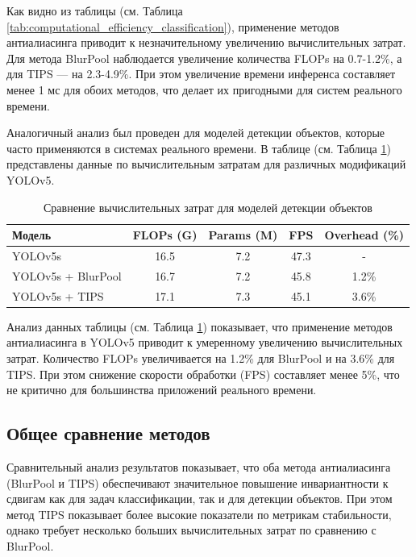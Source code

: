 Как видно из таблицы (см. Таблица \ref{tab:computational_efficiency_classification}), применение методов антиалиасинга приводит к незначительному увеличению вычислительных затрат. Для метода BlurPool наблюдается увеличение количества FLOPs на 0.7-1.2\%, а для TIPS — на 2.3-4.9\%. При этом увеличение времени инференса составляет менее 1 мс для обоих методов, что делает их пригодными для систем реального времени.

Аналогичный анализ был проведен для моделей детекции объектов, которые часто применяются в системах реального времени. В таблице (см. Таблица \ref{tab:computational_efficiency_detection}) представлены данные по вычислительным затратам для различных модификаций YOLOv5.

\begin{table}[h]
\centering
\begin{tabular}{|l|c|c|c|c|}
\hline
\textbf{Модель} & \textbf{FLOPs (G)} & \textbf{Params (M)} & \textbf{FPS} & \textbf{Overhead (\%)} \\
\hline
YOLOv5s & 16.5 & 7.2 & 47.3 & - \\
YOLOv5s + BlurPool & 16.7 & 7.2 & 45.8 & 1.2\% \\
YOLOv5s + TIPS & 17.1 & 7.3 & 45.1 & 3.6\% \\
\hline
\end{tabular}
\caption{Сравнение вычислительных затрат для моделей детекции объектов}
\label{tab:computational_efficiency_detection}
\end{table}

Анализ данных таблицы (см. Таблица \ref{tab:computational_efficiency_detection}) показывает, что применение методов антиалиасинга в YOLOv5 приводит к умеренному увеличению вычислительных затрат. Количество FLOPs увеличивается на 1.2\% для BlurPool и на 3.6\% для TIPS. При этом снижение скорости обработки (FPS) составляет менее 5\%, что не критично для большинства приложений реального времени.

\subsection{Общее сравнение методов}
\label{ssec:comparison}

Сравнительный анализ результатов показывает, что оба метода антиалиасинга (BlurPool и TIPS) обеспечивают значительное повышение инвариантности к сдвигам как для задач классификации, так и для детекции объектов. При этом метод TIPS показывает более высокие показатели по метрикам стабильности, однако требует несколько больших вычислительных затрат по сравнению с BlurPool.


